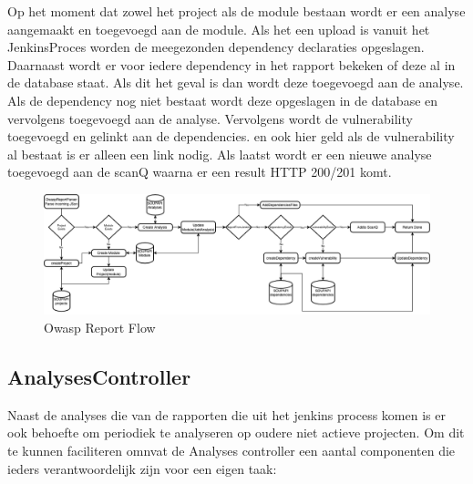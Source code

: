 Op het moment dat zowel het project als de module bestaan wordt er een analyse aangemaakt en toegevoegd aan de
module. Als het een upload is vanuit het JenkinsProces worden de meegezonden dependency declaraties opgeslagen. Daarnaast wordt er voor iedere dependency in het rapport bekeken of deze al in de database staat. Als dit het geval is dan wordt deze toegevoegd aan de analyse. Als de dependency nog niet bestaat wordt deze opgeslagen in de database en vervolgens toegevoegd aan de analyse. Vervolgens wordt de vulnerability toegevoegd en gelinkt aan de dependencies. en ook hier geld als de vulnerability al bestaat is er alleen een link nodig.
Als laatst wordt er een nieuwe analyse toegevoegd aan de scanQ waarna er een result HTTP 200/201 komt.
\begin{figure}[H]
    \myfloatalign
    \includegraphics[width=15cm]{gfx/SOUPAPI-ReportParseFlow}
    \caption{Owasp Report Flow}
    \label{fig:OwaspReportFlow}
\end{figure}

\subsection{AnalysesController}\label{subsec:controller}
Naast de analyses die van de rapporten die uit het jenkins process komen is er ook behoefte om periodiek te analyseren op oudere niet actieve projecten. Om dit te kunnen faciliteren omnvat de Analyses controller een aantal componenten die ieders verantwoordelijk zijn voor een eigen taak:

